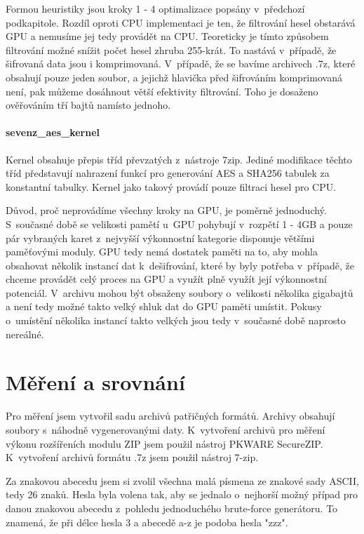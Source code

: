 Formou heuristiky jsou kroky 1 - 4 optimalizace popsány v~předchozí podkapitole. Rozdíl oproti
CPU implementaci je ten, že filtrování hesel obstarává GPU a nemusíme jej tedy provádět na CPU.
Teoreticky je tímto způsobem filtrování možné snížit počet hesel zhruba 255-krát. To nastává
v~případě, že šifrovaná data jsou i komprimovaná. V~případě, že se bavíme archivech .7z, které
obsahují pouze jeden soubor, a jejichž hlavička před šifrováním komprimovaná není, pak můžeme
dosáhnout větší efektivity filtrování. Toho je dosaženo ověřováním tří bajtů namísto jednoho.

\subsubsection{sevenz\_aes\_kernel}
Kernel obsahuje přepis tříd převzatých z~nástroje 7zip. Jediné modifikace těchto tříd představují
nahrazení funkcí pro generování AES a SHA256 tabulek za konstantní tabulky. Kernel jako
takový provádí pouze filtraci hesel pro CPU. 

Důvod, proč neprovádíme všechny kroky na GPU, je poměrně jednoduchý. S~současné době se velikosti
pamětí u~GPU pohybují v~rozpětí 1 - 4GB a pouze pár vybraných karet z~nejvyšší výkonnostní kategorie
disponuje většími paměťovými moduly. GPU tedy nemá dostatek paměti na to, aby mohla obsahovat
několik instancí dat k~dešifrování, které by byly potřeba v~případě, že chceme provádět celý proces na
GPU a využít plně využít její výkonnostní potenciál. V~archivu mohou být obsaženy soubory
o~velikosti několika gigabajtů a není tedy možné takto velký shluk dat do GPU paměti umístit. Pokusy
o~umístění několika instancí takto velkých jsou tedy v~současné době naprosto nereálné. 

\chapter{Měření a srovnání}
\label{ch:mereni_a_srovnani}
Pro měření jsem vytvořil sadu archivů patřičných formátů. Archivy obsahují soubory s~náhodně
vygenerovanými daty. K~vytvoření archivů pro měření výkonu rozšířeních modulu ZIP jsem použil
nástroj PKWARE SecureZIP. K~vytvoření archivů formátu .7z jsem použil nástroj 7-zip.

Za znakovou abecedu jsem si zvolil všechna malá písmena ze znakové sady ASCII, tedy 26 znaků.
Hesla byla volena tak, aby se jednalo o~nejhorší možný případ pro danou znakovou abecedu z~pohledu
jednoduchého brute-force generátoru. To znamená, že při délce hesla 3 a abecedě a-z je podoba
hesla "zzz".

